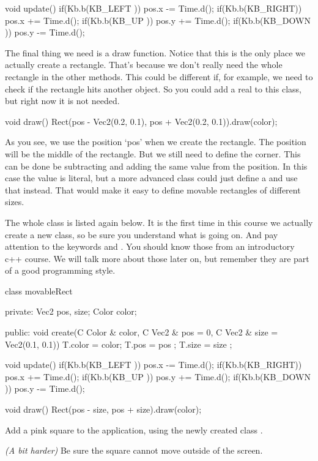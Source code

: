 \begin{code}
void update() {
	if(Kb.b(KB_LEFT )) pos.x -= Time.d();
	if(Kb.b(KB_RIGHT)) pos.x += Time.d();
	if(Kb.b(KB_UP   )) pos.y += Time.d();
	if(Kb.b(KB_DOWN )) pos.y -= Time.d();
}
\end{code}

The final thing we need is a draw function. Notice that this is the only place we actually create a rectangle. That's because we don't really need the whole rectangle in the other methods. This could be different if, for example, we need to check if the rectangle hits another object. So you could add a real  to this class, but right now it is not needed.

\begin{code}
void draw() {
  Rect(pos - Vec2(0.2, 0.1), pos + Vec2(0.2, 0.1)).draw(color);
}
\end{code}

As you see, we use the position `pos' when we create the rectangle. The position will be the middle of the rectangle. But we still need to define the corner. This can be done be subtracting and adding the same value from the position. In this case the value is literal, but a more advanced class could just define a  and use that instead. That would make it easy to define movable rectangles of different sizes.

The whole class is listed again below. It is the first time in this course we actually create a new class, so be sure you understand what is going on. And pay attention to the keywords  and . You should know those from an introductory c++ course. We will talk more about those later on, but remember they are part of a good programming style.

\begin{code}
class movableRect {
private:
  Vec2 pos, size;
	Color color;
	
public:
  void create(C Color & color, C Vec2 & pos = 0, C Vec2 & size = Vec2(0.1, 0.1)) {
	  T.color = color;
		T.pos   = pos  ;
		T.size  = size ;
	}
	
	void update() {
		if(Kb.b(KB_LEFT )) pos.x -= Time.d();
		if(Kb.b(KB_RIGHT)) pos.x += Time.d();
		if(Kb.b(KB_UP   )) pos.y += Time.d();
		if(Kb.b(KB_DOWN )) pos.y -= Time.d();
	}
	
	void draw() {
		Rect(pos - size, pos + size).draw(color);
	}
}
\end{code}
	
\begin{exercise}
Add a pink square to the application, using the newly created class .

\textit{(A bit harder)} Be sure the square cannot move outside of the screen.
\end{exercise}

